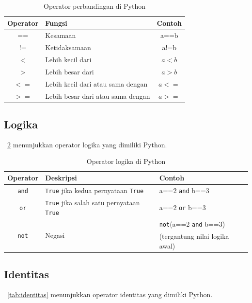 \begin{table}[h]
\caption{Operator perbandingan di Python}
\label{tab:perbandingan}
  \begin{center}
    \begin{tabular}{@{}clc@{}}\toprule
    Operator & Fungsi  & Contoh\\ \midrule
    == & Kesamaan & a==b \\
    != & Ketidaksamaan & a!=b \\
    $<$ & Lebih kecil dari & $a<b$ \\
    $>$ & Lebih besar dari & $a>b$ \\
    $<=$ & Lebih kecil dari atau sama dengan & $a<=$ \\
    $>=$ & Lebih besar dari atau sama dengan & $a>=$ \\
       \bottomrule
    \end{tabular}
  \end{center}
\end{table}

\subsection{Logika}
\tablename~\ref{tab:logika} menunjukkan operator logika yang dimiliki Python.

\begin{table}[h]
\caption{Operator logika di Python}
\label{tab:logika}
  \begin{center}
    \begin{tabular}{@{}cll@{}}\toprule
    Operator & Deskripsi  & Contoh\\ \midrule
    \texttt{and} & \texttt{True} jika kedua pernyataan \texttt{True} & a==2 \texttt{and} b==3 \\
    \texttt{or} & \texttt{True} jika salah satu pernyataan \texttt{True} & a==2 \texttt{or} b==3 \\
    \multirow{2}{*}{\texttt{not}} & \multirow{2}{*}{Negasi} & \texttt{not}(a==2 \texttt{and} b==3) \\
     & & (tergantung nilai logika awal) \\
       \bottomrule
    \end{tabular}
  \end{center}
\end{table}

\subsection{Identitas}
\tablename~\ref{tab:identitas} menunjukkan operator identitas yang dimiliki Python.

